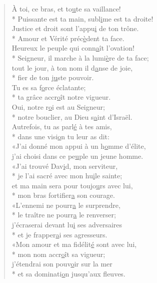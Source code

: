 \begin{verse}
À toi, ce bras, et to\underline{u}te sa vaillance! \\*
Puissante est ta main, subl\underline{i}me est ta droite! \\
Justice et droit sont l’appu\underline{i} de ton trône. \\*
Amour et Vérité préc\underline{è}dent ta face. \\

Heureux le peuple qui conn\underline{a}ît l’ovation! \\*
Seigneur, il marche à la lumi\underline{è}re de ta face; \\
tout le jour, à ton nom il d\underline{a}nse de joie, \\*
fier de ton j\underline{u}ste pouvoir. \\

Tu es sa f\underline{o}rce éclatante; \\*
ta grâce accr\underline{o}ît notre vigueur. \\
Oui, notre r\underline{o}i est au Seigneur; \\*
notre bouclier, au Dieu s\underline{a}int d’Israël. \\

Autrefois, tu as parl\underline{é} à tes amis, \\*
dans une visi\underline{o}n tu leur as dit: \\
«J’ai donné mon appui à un h\underline{o}mme d’élite, \\
j’ai choisi dans ce pe\underline{u}ple un jeune homme. \\

«J’ai trouvé Dav\underline{i}d, mon serviteur, \\*
je l’ai sacré avec mon hu\underline{i}le sainte; \\
et ma main sera pour toujo\underline{u}rs avec lui, \\*
mon bras fortifier\underline{a} son courage. \\

«L’ennemi ne pourr\underline{a} le surprendre, \\*
le traître ne pourr\underline{a} le renverser; \\
j’écraserai devant lu\underline{i} ses adversaires \\*
et je frapper\underline{a}i ses agresseurs. \\

«Mon amour et ma fidélit\underline{é} sont avec lui, \\*
mon nom accr\underline{o}ît sa vigueur; \\
j’étendrai son pouv\underline{o}ir sur la mer \\*
et sa dominati\underline{o}n jusqu’aux fleuves. \\


\end{verse}
